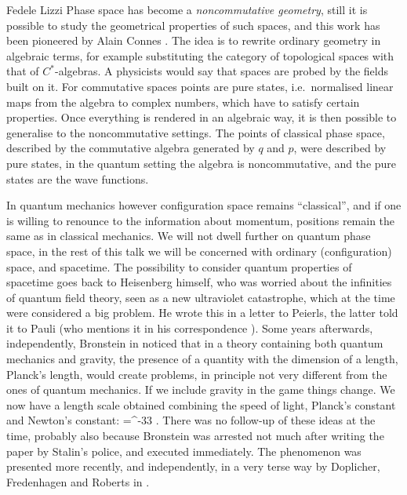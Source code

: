 \begin{artengenv}{Fedele Lizzi}
Phase space has become a \emph{noncommutative geometry}, still it is possible to study the geometrical properties of such spaces, and this work has been pioneered by Alain Connes \parencite*{Connesbook}. The idea is to rewrite ordinary geometry in algebraic terms, for example substituting the category of topological spaces with that of $C^*$-algebras. A physicists would say that spaces are probed by the fields built on it. For commutative spaces points are pure states, i.e.\ normalised linear maps from the algebra to complex numbers, which have to satisfy certain properties. Once everything is rendered in an algebraic way, it is then possible to generalise to the noncommutative settings. The points of classical phase space, described by the commutative algebra generated by $q$ and $p$, were described by pure states, in the quantum setting the algebra is noncommutative, and the pure states are the wave functions. 

In quantum mechanics however configuration space remains ``classical'', and if one is willing to renounce to the information about momentum, positions remain the same as in classical mechanics. 
We will not dwell further on quantum phase space, in the rest of this talk we will be concerned with ordinary (configuration) space, and spacetime. The possibility to consider quantum properties of spacetime goes back to Heisenberg himself, who was worried about the infinities of quantum field theory, seen as a new ultraviolet catastrophe, which at the time were considered a big problem. He wrote this in a letter to Peierls, the latter told it to Pauli (who mentions it in his correspondence \parencite{HeisenbergtoPeirleis}). Some years afterwards, independently, Bronstein in \parencite*{Bronstein} noticed that in a theory containing both quantum mechanics and gravity, the presence of a quantity with the dimension of a length, Planck's length, would create problems, in principle not very different from the ones of quantum mechanics. If we include gravity in the game things change. We now have a length scale obtained combining the speed of light, Planck's constant and Newton's constant:  
\be
\ell=^{-33} . \label{ell}
\ee
There was no follow-up of these ideas at the time, probably also because Bronstein was arrested not much after writing the paper by Stalin's police, and executed immediately. The phenomenon was presented more recently, and independently, in a very terse way by Doplicher, Fredenhagen and Roberts in \parencite*{DFR}.


\end{artengenv}
